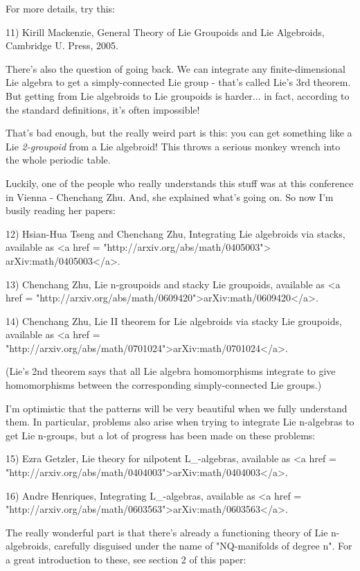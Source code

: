 For more details, try this:

11) Kirill Mackenzie, General Theory of Lie Groupoids and Lie 
Algebroids, Cambridge U. Press, 2005.

There's also the question of going back.  We can integrate any
finite-dimensional Lie algebra to get a simply-connected Lie group - 
that's called Lie's 3rd theorem.  But getting from Lie algebroids 
to Lie groupoids is harder... in fact, according to the standard 
definitions, it's often impossible!

That's bad enough, but the really weird part is this: you can 
get something like a Lie \emph{2-groupoid} from a Lie algebroid!  
This throws a serious monkey wrench into the whole periodic
table.

Luckily, one of the people who really understands this stuff
was at this conference in Vienna - Chenchang Zhu.  And, she 
explained what's going on.  So now I'm busily reading her papers:

12) Hsian-Hua Tseng and Chenchang Zhu, Integrating Lie algebroids 
via stacks, available as <a href = "http://arxiv.org/abs/math/0405003"> arXiv:math/0405003</a>.

13) Chenchang Zhu, Lie n-groupoids and stacky Lie groupoids, available
as <a href =
"http://arxiv.org/abs/math/0609420">arXiv:math/0609420</a>.

14) Chenchang Zhu, Lie II theorem for Lie algebroids via stacky 
Lie groupoids, available as <a href = "http://arxiv.org/abs/math/0701024">arXiv:math/0701024</a>.

(Lie's 2nd theorem says that all Lie algebra homomorphisms 
integrate to give homomorphisms between the corresponding 
simply-connected Lie groups.)

I'm optimistic that the patterns will be very beautiful when we 
fully understand them.  In particular, problems also arise
when trying to integrate Lie n-algebras to get Lie n-groups, but
a lot of progress has been made on these problems:
 
15) Ezra Getzler, Lie theory for nilpotent L_{\infty }-algebras,
available as <a href = "http://arxiv.org/abs/math/0404003">arXiv:math/0404003</a>.

16) Andre Henriques, Integrating L_{\infty }-algebras, available
as <a href = "http://arxiv.org/abs/math/0603563">arXiv:math/0603563</a>.

The really wonderful part is that there's already a functioning
theory of Lie n-algebroids, carefully disguised under the name of 
"NQ-manifolds of degree n".  For a great introduction to these, 
see section 2 of this paper:

